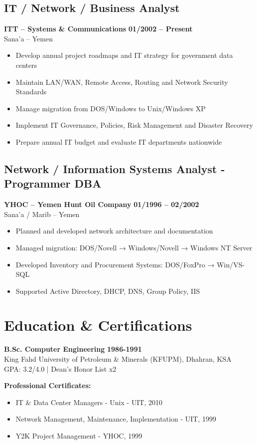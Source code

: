 \documentclass[a4paper,11pt]{article}
\begin{document}
\begin{otherlanguage}{english}
\subsection*{IT / Network / Business Analyst}
\textbf{ITT – Systems \& Communications} \hfill \textbf{01/2002 – Present} \\
Sana'a – Yemen
\begin{itemize}
\item Develop annual project roadmaps and IT strategy for government data centers
\item Maintain LAN/WAN, Remote Access, Routing and Network Security Standards
\item Manage migration from DOS/Windows to Unix/Windows XP
\item Implement IT Governance, Policies, Risk Management and Disaster Recovery
\item Prepare annual IT budget and evaluate IT departments nationwide
\end{itemize}

\subsection*{Network / Information Systems Analyst - Programmer DBA}
\textbf{YHOC – Yemen Hunt Oil Company} \hfill \textbf{01/1996 – 02/2002} \\
Sana'a / Marib – Yemen
\begin{itemize}
\item Planned and developed network architecture and documentation
\item Managed migration: DOS/Novell → Windows/Novell → Windows NT Server
\item Developed Inventory and Procurement Systems: DOS/FoxPro → Win/VS-SQL
\item Supported Active Directory, DHCP, DNS, Group Policy, IIS
\end{itemize}

\section*{Education \& Certifications}
\textbf{B.Sc. Computer Engineering} \hfill \textbf{1986-1991} \\
King Fahd University of Petroleum \& Minerals (KFUPM), Dhahran, KSA \\
GPA: 3.2/4.0 | Dean's Honor List x2

\textbf{Professional Certificates:}
\begin{itemize}
\item IT \& Data Center Managers - Unix - UIT, 2010
\item Network Management, Maintenance, Implementation - UIT, 1999
\item Y2K Project Management - YHOC, 1999
\end{itemize}


\end{otherlanguage}
\end{document}
